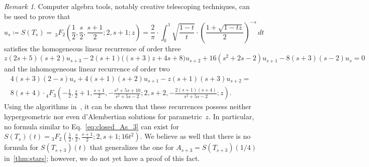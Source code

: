 \documentclass[12pt]{amsart}
\newcommand{\revision}[1]{{#1}}
\theoremstyle{plain}
\theoremstyle{remark}
\newtheorem{remark}[lemma]{Remark}
\begin{document}
\begin{remark}\label{rmk:stars_series_pas_si_simple}
Computer algebra tools, notably creative telescoping \revision{techniques}, can be used to prove that
\[
u_s \coloneqq \revision{S(T_s) =}\, {}_{3}^{}{{}{{}{F_{2}^{}}}} \left(\frac{1}{2},\frac{s}{2},\frac{s+1}{2};2,s +1; z \right)
 =
\frac{2}{\pi}
\cdot \int_0^1 \sqrt{\frac{1-t}{t}} \cdot 
\left( \frac{1 + \sqrt{1-tz}}{2}\right)^{-s}
 \, dt 
\]
\revision{satisfies the homogeneous linear recurrence of order three}
\[
z \left(2 s +5\right) \left(s +2\right) u_{s +3}
-2 \left(s +1\right) \big( (s+3) z +4 s +8\big) u_{s +2}
+16 \left( s^{2}+ 2 s -2\right) u_{s +1}
-8 \left(s +3\right) \left(s -2\right) u_s = 0 
\]
\revision{and the inhomogeneous linear recurrence of order two}
\begin{equation*}
\begin{split}
4 \left(s +3\right) \left(2-s \right) u _s
+4 \left(s +1\right) \left(s +2\right) u_{s +1}
-z \left(s +1\right) \left(s +3\right) u_{s +2}
  =  \\
\revision{
{8 \left(s + 4\right)}
\cdot  {}_{4}^{}{{}{{}{F_{3}^{}}}}  
\left(
-\frac{1}{2}, \frac{s}{2}+1, \frac{s+1}{2}, - \frac{s^{2}+5 s +10} {s^{2}+5 s -2}; 2, s +2, -\frac{2 (s+1)(s+4)}{s^{2}+5 s -2}; z \right) .
}
\end{split}
\end{equation*}
Using the algorithms in~\cite{Petkovsek92,AbPe94}, \revision{it can be shown that these recurrences possess neither hypergeometric nor even d'Alembertian solutions
for parametric~$z$.}
In particular, no formula 
\revision{similar to Eq.~\eqref{eq:closed_As_3}}
can exist for \revision{$S(T_s)(t) = {}_{3}^{}{{}{{}{F_{2}^{}}}} \left(\frac{1}{2},\frac{s}{2},\frac{s+1}{2};2,s +1; 16 t^2 \right)$.
We believe as well that there is no formula for $S(T_{s+3})(t)$ that generalizes the one for $A_{s+3} = S(T_{s+3})(1/4)$ in~\cref{thm:stars}; however, we do not yet have a proof of this fact.
}
\end{remark}
\end{document}

